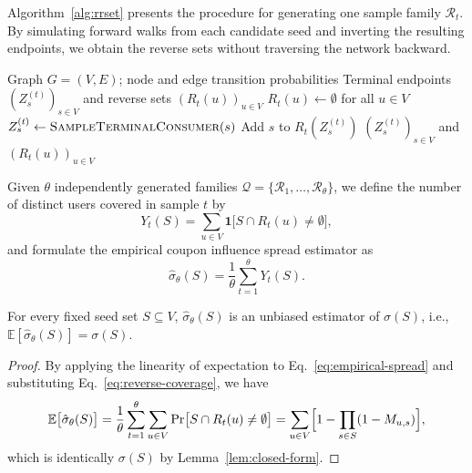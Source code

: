 \documentclass[sigconf]{acmart}
\begin{document}
Algorithm~\ref{alg:rrset} presents the procedure for generating one sample
family $\mathcal{R}_t$.
By simulating forward walks from each candidate seed and inverting the
resulting endpoints, we obtain the reverse sets without traversing the network
backward.

\begin{algorithm}[t]
\caption{Generate One Family of Reverse Coverage Sets}
\label{alg:rrset}
\begin{algorithmic}[1]
\Require Graph $G=(V,E)$; node and edge transition probabilities
\Ensure Terminal endpoints $(Z_s^{(t)})_{s\in V}$ and reverse sets $(R_t(u))_{u\in V}$
\State $R_t(u) \gets \emptyset$ for all $u \in V$
  \State $Z_s^{(t)} \gets \Call{SampleTerminalConsumer}{s}$ 
    \State Add $s$ to $R_t(Z_s^{(t)})$
  \EndIf
\EndFor
\State \Return $(Z_s^{(t)})_{s\in V}$ and $(R_t(u))_{u\in V}$
\end{algorithmic}
\end{algorithm}

Given $\theta$ independently generated families $\mathcal{Q} = \{\mathcal{R}_1,
\ldots, \mathcal{R}_\theta\}$, we define the number of distinct users covered in
sample $t$ by
\begin{equation}
\label{eq:yt-def}
  Y_t(S) = \sum_{u\in V} \mathbf{1}\bigl[S \cap R_t(u) \ne \emptyset\bigr],
\end{equation}
and formulate the empirical coupon influence spread estimator as
\begin{equation}
\label{eq:empirical-spread}
  \hat{\sigma}_{\theta}(S) = \frac{1}{\theta} \sum_{t=1}^{\theta} Y_t(S).
\end{equation}

\begin{lemma}[Unbiasedness]
\label{lem:unbiased}
For every fixed seed set $S \subseteq V$, $\hat{\sigma}_{\theta}(S)$ is an
unbiased estimator of $\sigma(S)$, i.e., $\mathbb{E}[\hat{\sigma}_{\theta}(S)] = \sigma(S)$.
\end{lemma}

\begin{proof}
By applying the linearity of expectation to Eq.~\eqref{eq:empirical-spread} and
substituting Eq.~\eqref{eq:reverse-coverage}, we have
\[
  \mathbb{E}\bigl[\hat{\sigma}_{\theta}(S)\bigr]
  =
  \frac{1}{\theta}\sum_{t=1}^{\theta}\sum_{u\in V}
  \Pr\bigl[S \cap R_t(u) \ne \emptyset\bigr]
  =
  \sum_{u\in V} \Bigl[1 - \prod_{s\in S}(1 - M_{u,s})\Bigr],
\]
which is identically $\sigma(S)$ by Lemma~\ref{lem:closed-form}.
\end{proof}
\end{document}
